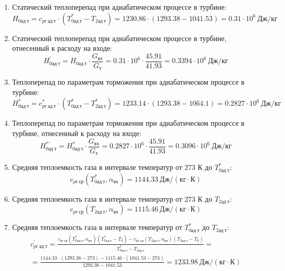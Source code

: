 \documentclass[a4paper,12pt]{article}
\begin{document}
\begin{enumerate}
        \item Статический теплоперепад при адиабатическом процессе в турбине:
        \[
            H_{0ад\ т} = c_{pг\ ад\ т} \cdot \left(
            T_{0ад\ т}^* - T_{2ад\ т}
            \right) =
            1230.86 \cdot \left(
            1293.38 - 1041.53
            \right) =
            0.31 \cdot 10^6 \ Дж/кг
        \]

        \item Статический теплоперепад при адиабатическом процессе в турбине, отнесенный к расходу на входе:
        \[
            H_{0ад\ т}^\prime = H_{0ад\ т} \cdot \frac{ G_{вх} }{ G_т }  =
                0.31 \cdot 10^6 \cdot
                \frac{ 45.91 }{ 41.93 } =
            0.3394 \cdot 10^6 \ Дж/кг
        \]

        \item Теплоперепад по параметрам торможения при адиабатическом процессе в турбине:
        \[
            H_{0ад\ т}^* = c_{pг\ ад\ т}^* \cdot \left(
            T_{0ад\ т}^* - T_{2ад\ т}^*
            \right) =
            1233.14 \cdot \left(
            1293.38 - 1064.1
            \right) =
            0.2827 \cdot 10^6 \ Дж/кг
        \]

        \item Теплоперепад по параметрам торможения при адиабатическом процессе в турбине, отнесенный к расходу на входе:
        \[
            H_{0ад\ т}^{*\prime} = H_{0ад\ т}^* \cdot \frac{ G_{вх} }{ G_т }  =
                0.2827 \cdot 10^6 \cdot
                \frac{ 45.91 }{ 41.93 } =
            0.3096 \cdot 10^6 \ Дж/кг
        \]

        \item Средняя теплоемкость газа в интервале температур от 273 К до $T_{0ад\ т}^*$:
        \[
            c_{pг\ ср} (T_{0ад\ т}^*, \alpha_{вх}) =
            1144.33 \ Дж/(кг \cdot К)
        \]

        \item Средняя теплоемкость газа в интервале температур от 273 К до $T_{2ад\ т}$:
        \[
            c_{pг\ ср} (T_{2ад\ т}, \alpha_{вх}) =
            1115.46 \ Дж/(кг \cdot К)
        \]

        \item Средняя теплоемкость газа в интервале температур от $T_{0ад\ т}^*$ до $T_{2ад\ т}$:
        \begin{gather*}
            c_{pг\ ад\ т}^\prime = \frac{
		        c_{pг\ ср} (T_{0ад\ т}^*, \alpha_{вх}) (T_{0ад\ т}^* - T_0) - c_{pг\ ср} (T_{2ад\ т}, \alpha_{вх})(T_{2ад\ т} - T_0)
		    }{
		        T_{0ад\ т}^* - T_{2ад\ т}} =\\
            =\frac{
		        1144.33 \cdot
                (1293.38 - 273) -
		        1115.46 \cdot
                (1041.53 - 273)
		    }{
		        1293.38 - 1041.53} =
		    1233.98 \ Дж / (кг \cdot К)\\
        \end{gather*}


\end{enumerate}
\end{document}

